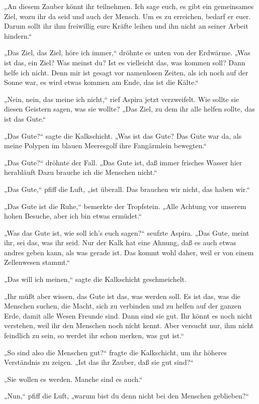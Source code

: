 „An diesem Zauber könnt ihr teilnehmen. Ich sage euch, es gibt ein
gemeinsames Ziel, wozu ihr da seid und auch der Mensch. Um es zu
erreichen, bedarf er euer. Darum sollt ihr ihm freiwillig eure
Kräfte leihen und ihn nicht an seiner Arbeit hindern.“

„Das Ziel, das Ziel, höre ich immer,“ dröhnte es unten von der
Erdwärme. „Was ist das, ein Ziel? Was meinst du? Ist es vielleicht
das, was kommen soll? Dann helfe ich nicht. Denn mir ist gesagt vor
namenlosen Zeiten, als ich noch auf der Sonne war, es wird etwas
kommen am Ende, das ist die Kälte.“

„Nein, nein, das meine ich nicht,“ rief Aspira jetzt verzweifelt.
Wie sollte sie diesen Geistern sagen, was sie wollte? „Das Ziel, zu
dem ihr alle helfen sollte, das ist das Gute.“

„Das Gute?“ sagte die Kalkschicht. „Was ist das Gute? Das Gute war
da, als meine Polypen im blauen Meeresgolf ihre Fangärmlein
bewegten.“

„Das Gute?“ dröhnte der Fall. „Das Gute ist, daß immer frisches
Wasser hier herabläuft Dazu brauche ich die Menschen nicht.“

„Das Gute,“ pfiff die Luft, „ist überall. Das brauchen wir nicht,
das haben wir.“

„Das Gute ist die Ruhe,“ bemerkte der Tropfstein. „Alle Achtung vor
unserem hohen Besuche, aber ich bin etwas ermüdet.“

„Was das Gute ist, wie soll ich's euch sagen?“ seufzte Aspira. „Das
Gute, meint ihr, sei das, was ihr seid. Nur der Kalk hat eine
Ahnung, daß es auch etwas andres geben kann, als was gerade ist.
Das kommt wohl daher, weil er von einem Zellenwesen stammt.“

„Das will ich meinen,“ sagte die Kalkschicht geschmeichelt.

„Ihr müßt aber wissen, das Gute ist das, was werden soll. Es ist
das, was die Menschen suchen, die Macht, sich zu verbinden und zu
helfen auf der ganzen Erde, damit alle Wesen Freunde sind. Dann
sind sie gut. Ihr könnt es noch nicht verstehen, weil ihr den
Menschen noch nicht kennt. Aber versucht nur, ihm nicht feindlich
zu sein, so werdet ihr schon merken, was gut ist.“

„So sind also die Menschen gut?“ fragte die Kalkschicht, um ihr
höheres Verständnis zu zeigen. „Ist das ihr Zauber, daß sie gut
sind?“

„Sie wollen es werden. Manche sind es auch.“

„Nun,“ pfiff die Luft, „warum bist du denn nicht bei den Menschen
geblieben?“


